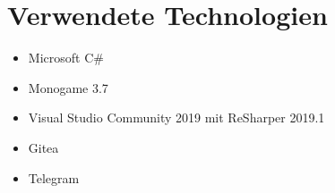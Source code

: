 \section{Verwendete Technologien}



\begin{itemize}[leftmargin=*, nosep]
    \item Microsoft C\#
    \item Monogame 3.7
    \item Visual Studio Community 2019 mit ReSharper 2019.1
    \item Gitea
    \item Telegram
\end{itemize}
